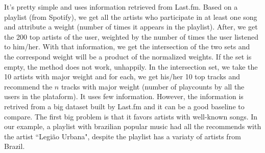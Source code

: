 \documentclass{article}
\begin{document}
It's pretty simple and uses information retrieved from Last.fm. Based on a
playlist (from Spotify), we get all the artists who participate in at least
one song and attribute a weight (number of times it appears in the playlist). After, we get the 200 top artists of the user, weighted by the number of
times the user listened to him/her. With that information, we get the
intersection of the two sets and the correspond weight will be a product of
the normalized weights. If the set is empty, the method does not work, unhappily.
In the intersection set, we take the 10 artists with major weight and for each,
we get his/her 10 top tracks and recommend the $n$ tracks with major weight
(number of playcounts by all the users in the plataform). It uses few information. However, the information is
retrived from a big dataset built by Last.fm and it can be a good baseline to
compare. The first big problem is that it favors artists with well-known
songs. In our example, a playlist with brazilian popular music had all the
recommends with the artist ``Legião Urbana", despite the playlist has a variaty
of artists from Brazil. 
\end{document}
